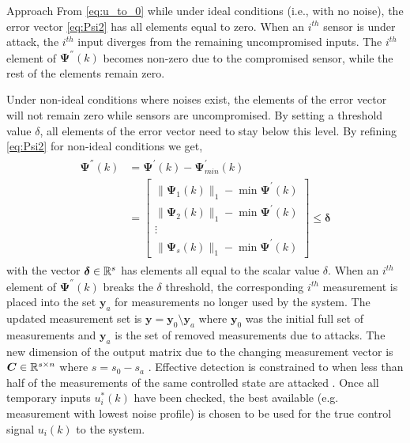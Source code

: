 \begin{section}{Approach}
From \eqref{eq:u_to_0} while under ideal conditions (i.e., with no noise), the error vector \eqref{eq:Psi2} has all elements equal to zero. When an $i^{th}$ sensor is under attack, the $i^{th}$ input diverges from the remaining uncompromised inputs. The $i^{th}$ element of $\bm{\Psi}^{''}(k)$ becomes non-zero due to the compromised sensor, while the rest of the elements remain zero. 

Under non-ideal conditions where noises exist, the elements of the error vector will not remain zero while sensors are uncompromised. By setting a threshold value $\delta$, all elements of the error vector need to stay below this level. By refining \eqref{eq:Psi2} for non-ideal conditions we get,
    \begin{align}
    \begin{split}
    \label{eq:Psi2_nonideal}
	\bm{\Psi^{''}}(k)&=\bm{\Psi^{'}}(k)-\bm{\Psi}^{'}_{min}(k) \\
	& =\begin{bmatrix} \lVert{\bm{\Psi}_1(k)}\rVert_1 - \min \bm{\Psi}^{'}(k)\\ \lVert{\bm{\Psi}_2(k)}\rVert_1 - \min \bm{\Psi}^{'}(k) \\ \vdots \\ \lVert{\bm{\Psi}_s(k)}\rVert_1 - \min \bm{\Psi}^{'}(k) \end{bmatrix} \leq \bm{\delta}
	\end{split}
	\end{align}
with the vector $\bm{\delta} \in \mathbb{R}^s$ has elements all equal to the scalar value $\delta$. When an $i^{th}$ element of $\bm{\Psi^{''}}(k)$ breaks the $\delta$ threshold, the corresponding $i^{th}$ measurement is placed into the set $\bm{y}_a$ for measurements no longer used by the system. The updated measurement set is $\bm{y}=\bm{y}_0\setminus\bm{y}_a$ where $\bm{y}_0$ was the initial full set of measurements and $\bm{y}_a$ is the set of removed measurements due to attacks. The new dimension of the output matrix due to the changing measurement vector is $\bm{C} \in \mathbb{R}^{s\times n}$ where $s=s_0-s_a$ . Effective detection is constrained to when less than half of the measurements of the same controlled state are attacked . Once all temporary  inputs $u_i^*(k)$ have been checked, the best available (e.g. measurement with lowest noise profile) is chosen to be used for the true control signal $u_i(k)$ to the system.




\end{section}

